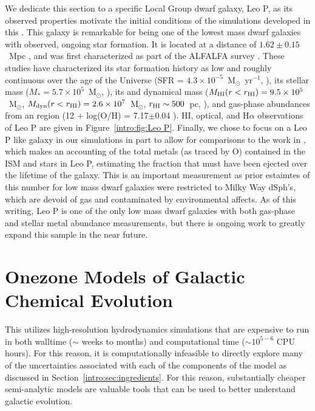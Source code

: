 We dedicate this section to a specific Local Group dwarf galaxy, Leo P, as its observed properties motivate the initial conditions of the simulations developed in this \dissertation. This galaxy is remarkable for being one of the lowest mass dwarf galaxies with observed, ongoing star formation. It is located at a distance of $1.62\pm 0.15$~Mpc \citep{McQuinn2015a}, and was first characterized as part of the ALFALFA survey \citep{Giovanelli2013,Rhode2013,Skillman2013,McQuinn2013,Bernstein-Cooper2014}. These studies have characterized its star formation history as low and roughly continuous over the age of the Universe (SFR = $4.3\times 10^{-5}$~M$_{\odot}$~yr$^{-1}$, \cite{McQuinn2015a}), its stellar mass ($M_{*} = 5.7 \times 10^{5}$~M$_{\odot}$, \cite{McQuinn2013}), its \hi and dynamical mass ($M_{\rm HI}(r<r_{\rm HI}) = 9.5\times 10^{5}$~M$_{\odot}$, $M_{\rm dyn}(r<r_{\rm HI}) = 2.6 \times 10^{7}$~M$_{\odot}$, $r_{\rm HI} \sim 500$~pc, \cite{Bernstein-Cooper2014}), and gas-phase abundances from an \hii region (12 + log(O/H) = 7.17$\pm$0.04 \cite{Skillman2013}). HI, optical, and H$\alpha$ observations of Leo P are given in Figure~\ref{intro:fig:Leo P}. Finally, we chose to focus on a Leo P like galaxy in our simulations in part to allow for comparisons to the work in \cite{McQuinn2015}, which makes an accounting of the total metals (as traced by O) contained in the ISM and stars in Leo P, estimating the fraction that must have been ejected over the lifetime of the galaxy. This is an important measurement as prior estaimtes of this number for low mass dwarf galaxies were restricted to Milky Way dSph's, which are devoid of gas and contaminated by environmental affects. As of this writing, Leo P is one of the only low mass dwarf galaxies with both gas-phase and stellar metal abundance measurements, but there is ongoing work to greatly expand this sample in the near future.

\section{Onezone Models of Galactic Chemical Evolution}
\label{intro:sec:onezone}

This \dissertation utilizes high-resolution hydrodynamics simulations that are expensive to run in both walltime ($\sim$ weeks to months) and computational time ($\sim 10^{5-6}$ CPU hours). For this reason, it is computationally infeasible to directly explore many of the uncertainties associated with each of the components of the model as discussed in Section~\ref{intro:sec:ingredients}. For this reason, substantially cheaper semi-analytic models are valuable tools that can be used to better understand galactic evolution.

